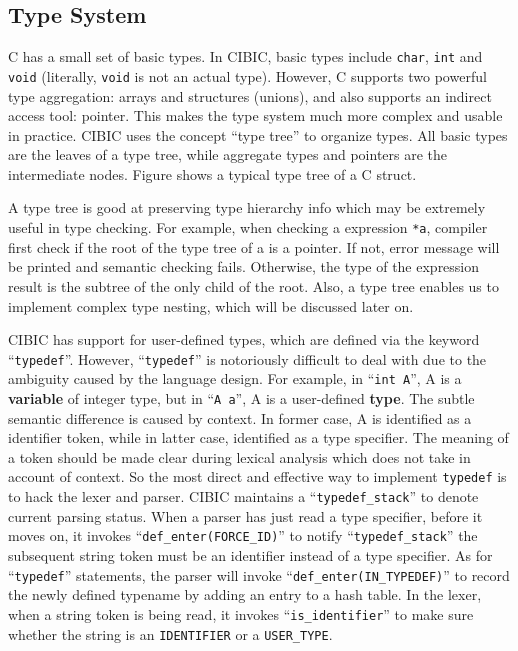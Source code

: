 \documentclass[10pt, a4paper]{article}
\begin{document}
\subsection{Type System}
C has a small set of basic types. In CIBIC, basic types include \texttt{char},
\texttt{int} and \texttt{void} (literally, \texttt{void} is not an actual
type). However, C supports two powerful type aggregation: arrays and structures
(unions), and also supports an indirect access tool: pointer. This makes the
type system much more complex and usable in practice. CIBIC uses the concept
``type tree'' to organize types. All basic types are the leaves of a type tree,
while aggregate types and pointers are the intermediate nodes. Figure shows a
typical type tree of a C struct. 

A type tree is good at preserving type hierarchy info which may be extremely
useful in type checking. For example, when checking a expression \texttt{*a},
compiler first check if the root of the type tree of a is a pointer. If not,
error message will be printed and semantic checking fails. Otherwise, the type
of the expression result is the subtree of the only child of the root. Also, a
type tree enables us to implement complex type nesting, which will be discussed
later on.

CIBIC has support for user-defined types, which are defined via the keyword
``\texttt{typedef}''.  However, ``\texttt{typedef}'' is notoriously difficult
to deal with due to the ambiguity caused by the language design. For example,
in ``\texttt{int A}'', A is a \textbf{variable} of integer type, but in
``\texttt{A a}'', A is a user-defined \textbf{type}. The subtle semantic
difference is caused by context. In former case, A is identified as a
identifier token, while in latter case, identified as a type specifier. The
meaning of a token should be made clear during lexical analysis which does not
take in account of context. So the most direct and effective way to implement
\texttt{typedef} is to hack the lexer and parser. CIBIC maintains a
``\texttt{typedef\_stack}'' to denote current parsing status. When a parser has
just read a type specifier, before it moves on, it invokes
``\texttt{def\_enter(FORCE\_ID)}'' to notify ``\texttt{typedef\_stack}'' the
subsequent string token must be an identifier instead of a type specifier. As
for ``\texttt{typedef}'' statements, the parser will invoke
``\texttt{def\_enter(IN\_TYPEDEF)}'' to record the newly defined typename by
adding an entry to a hash table. In the lexer, when a string token is being
read, it invokes ``\texttt{is\_identifier}'' to make sure whether the string is
an \texttt{IDENTIFIER} or a \texttt{USER\_TYPE}. 
\end{document}
